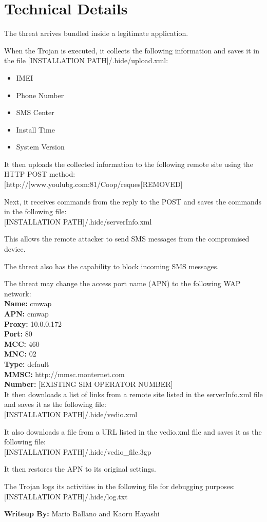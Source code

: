 \section{Technical Details}

The threat arrives bundled inside a legitimate application.

When the Trojan is executed, it collects the following information and saves it in the file [INSTALLATION PATH]/.hide/upload.xml:
\begin{itemize}
	\item IMEI
	\item Phone Number
	\item SMS Center
	\item Install Time
	\item System Version
\end{itemize}

It then uploads the collected information to the following remote site using the HTTP POST method: \\
{[}http://{]}www.youlubg.com:81/Coop/reques[REMOVED]

Next, it receives commands from the reply to the POST and saves the commands in the following file: \\
{[}INSTALLATION PATH{]}/.hide/serverInfo.xml

This allows the remote attacker to send SMS messages from the compromised device.

The threat also has the capability to block incoming SMS messages.

The threat may change the access port name (APN) to the following WAP network: \\
\textbf{Name:} cmwap \\
\textbf{APN:} cmwap \\
\textbf{Proxy:} 10.0.0.172 \\
\textbf{Port:} 80 \\
\textbf{MCC:} 460 \\
\textbf{MNC:} 02 \\
\textbf{Type:} default \\
\textbf{MMSC:} http://mmsc.monternet.com \\
\textbf{Number:} [EXISTING SIM OPERATOR NUMBER] \\

It then downloads a list of links from a remote site listed in the serverInfo.xml file and saves it as the following file: \\
{[}INSTALLATION PATH{]}/.hide/vedio.xml

It also downloads a file from a URL listed in the vedio.xml file and saves it as the following file: \\
{[}INSTALLATION PATH{]}/.hide/vedio\_file.3gp

It then restores the APN to its original settings.

The Trojan logs its activities in the following file for debugging purposes: \\
{[}INSTALLATION PATH{]}/.hide/log.txt

\textbf{Writeup By:} Mario Ballano and Kaoru Hayashi
